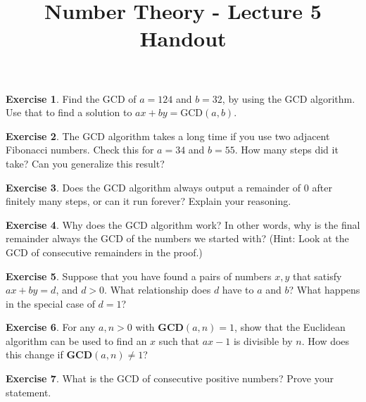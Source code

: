 \documentclass[11pt]{article}
\theoremstyle{definition}
\newtheorem{exercise}{Exercise}
\numberwithin{thm}{section}
\begin{document}
\title{Number Theory - Lecture 5 Handout}

\maketitle


\begin{exercise} Find the GCD of $a = 124$ and $b = 32$, by using the GCD algorithm. Use that to find a solution to $ax + by = \text{GCD}(a,b)$.
\end{exercise}

\begin{exercise} The GCD algorithm takes a long time if you use two adjacent Fibonacci numbers. Check this for $a = 34$ and $b = 55$. How many steps did it take? Can you generalize this result?
\end{exercise}

\begin{exercise} Does the GCD algorithm always output a remainder of $0$ after finitely many steps, or can it run forever? Explain your reasoning.
\end{exercise}

\begin{exercise} Why does the GCD algorithm work? In other words, why is the final remainder always the GCD of the numbers we started with? (Hint: Look at the GCD of consecutive remainders in the proof.)
\end{exercise}

\begin{exercise} Suppose that you have found a pairs of numbers $x,y$ that satisfy $ax + by = d$, and $d >0$. What relationship does $d$ have to $a$ and $b$? What happens in the special case of $d = 1$?
\end{exercise}

\begin{exercise} For any $a,n>0$ with $\textbf{GCD}(a, n) = 1$, show that the Euclidean algorithm can be used to find an $x$ such that $ax - 1$ is divisible by $n$. How does this change if $\textbf{GCD}(a, n) \neq 1$?
\end{exercise}

\begin{exercise} What is the GCD of consecutive positive numbers? Prove your statement.
\end{exercise}
\end{document}
